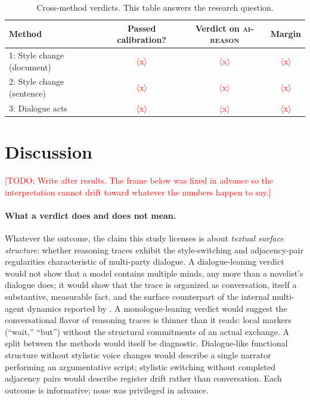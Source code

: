 \documentclass[11pt]{article}
\newcommand{\todo}[1]{\textcolor{red}{[TODO: #1]}}
\newcommand{\resultnum}[1]{\textcolor{red}{$\langle$#1$\rangle$}}
\newcommand{\cellrt}{\textsc{ai-reason}}
\begin{document}
\begin{table}[t]
\centering
\caption{Cross-method verdicts. This table answers the research question.}
\label{tab:verdicts}
\small
\begin{tabular}{@{}lccc@{}}
\toprule
Method & Passed calibration? & Verdict on \cellrt{} & Margin \\
\midrule
1: Style change (document) & \resultnum{x} & \resultnum{x} & \resultnum{x} \\
2: Style change (sentence) & \resultnum{x} & \resultnum{x} & \resultnum{x} \\
3: Dialogue acts & \resultnum{x} & \resultnum{x} & \resultnum{x} \\
\bottomrule
\end{tabular}
\end{table}

\section{Discussion}
\label{sec:discussion}

\todo{Write after results. The frame below was fixed in advance so the
interpretation cannot drift toward whatever the numbers happen to say.}

\paragraph{What a verdict does and does not mean.}
Whatever the outcome, the claim this study licenses is about \emph{textual
surface structure}: whether reasoning traces exhibit the style-switching and
adjacency-pair regularities characteristic of multi-party dialogue. A
dialogue-leaning verdict would not show that a model contains multiple
minds, any more than a novelist's dialogue does; it would show that the
trace is organized as conversation, itself a substantive, measurable fact,
and the surface counterpart of the internal multi-agent dynamics reported by
\citet{kim2026societies}. A monologue-leaning verdict would suggest the
conversational flavor of reasoning traces is thinner than it reads: local
markers (``wait,'' ``but'') without the structural commitments of an actual
exchange. A split between the methods would itself be
diagnostic. Dialogue-like functional structure without stylistic voice
changes would describe a single narrator performing an argumentative
script; stylistic switching without completed adjacency pairs would describe
register drift rather than conversation. Each outcome is informative; none
was privileged in advance.
\end{document}
